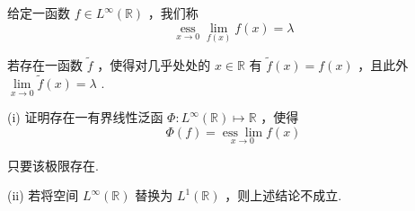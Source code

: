 \begin{rbhw}
给定一函数 $f \in  {L}^{\infty }\left( \mathbb{R}\right)$ ，我们称
\[
\mathop{\operatorname{ess}}\limits_{{x \rightarrow  0}}\mathop{\lim }\limits_{{f\left( x\right) }}f\left( x\right)  = \lambda
\]

若存在一函数 $\widetilde{f}$ ，使得对几乎处处的 $x \in  \mathbb{R}$ 有 $\widetilde{f}\left( x\right)  = f\left( x\right)$ ，且此外 $\mathop{\lim }\limits_{{x \rightarrow  0}}\widetilde{f}\left( x\right)  = \lambda$ .

(i) 证明存在一有界线性泛函 $\Phi  : {L}^{\infty }\left( \mathbb{R}\right)  \mapsto  \mathbb{R}$ ，使得
\[
\Phi \left( f\right)  = \underset{x \rightarrow  0}{\operatorname{ess}\lim }f\left( x\right)
\]

只要该极限存在.

(ii) 若将空间 ${L}^{\infty }\left( \mathbb{R}\right)$ 替换为 ${L}^{1}\left( \mathbb{R}\right)$ ，则上述结论不成立.
\end{rbhw}
